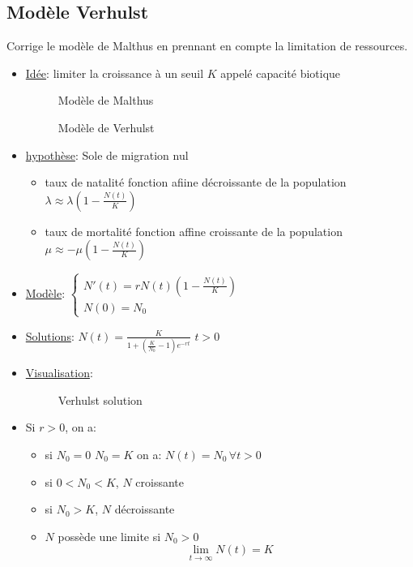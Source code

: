 \subsection{Modèle Verhulst}
Corrige le modèle de Malthus en prennant en compte la limitation de ressources.
\begin{itemize}
    \item \underline{Idée}: limiter la croissance à un seuil $K$ appelé capacité biotique
\begin{figure}[H]
    \centering
    \caption{Modèle de Malthus}
    \label{fig:malthus-prendre-en-compte}
\end{figure}
\begin{figure}[H]
    \centering
    \caption{Modèle de Verhulst}
    \label{fig:verhulst}
\end{figure}
\item \underline{hypothèse}: Sole de migration nul
    \begin{itemize}
        \item taux de natalité fonction afiine décroissante de la population $\lambda \approx \lambda (1 - \frac{N(t)}{K})$ 
        \item taux de mortalité fonction affine croissante de la population $\mu \approx -\mu (1 - \frac{N(t)}{K})$
    \end{itemize}
\item \underline{Modèle}: $\begin{cases}
    N'(t) = rN(t)(1 - \frac{N(t)}{K})\\
    N(0) = N_0
\end{cases}$
\item \underline{Solutions}: $N(t) = \frac{K}{1 + (\frac{K}{N_0} - 1) e^{-rt}}$ \quad $t > 0$ 
\item \underline{Visualisation}:
    \begin{figure}[H]
    \centering
    \caption{Verhulst solution}
    \label{fig:verhulst-visualisation}
\end{figure}
\item 
    \begin{property}
    Si $r>0$, on a:
    \begin{itemize}
        \item si $N_0 = 0$ $N_0 = K$ on a: $N(t) = N_0 \, \forall t > 0$
        \item si $0 < N_0 < K$, $N$ croissante
        \item si $N_0 > K$, $N$ décroissante 
        \item $N$ possède une limite si  $N_0 > 0$
            \[
            \lim_{t \to \infty} N(t) = K
            \] 
    \end{itemize}
    \end{property}
\end{itemize}
